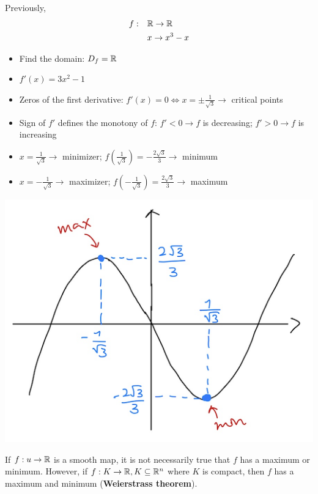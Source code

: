 Previously,
\begin{equation*}
    \begin{split}
        f: & \quad\mathbb{R}\to\mathbb{R}\\
        & \quad x\to x^3-x
    \end{split}
\end{equation*}
\begin{itemize}
    \item Find the domain: $D_f = \mathbb{R}$
    \item $f'(x) = 3x^2-1$
    \item Zeros of the first derivative: $f'(x)=0\Leftrightarrow x=\pm\frac{1}{\sqrt{3}} \to$ critical points
    \item Sign of $f'$ defines the monotony of $f$: $f'<0\to f$ is decreasing; $f'>0\to f$ is increasing
    \item $x=\frac{1}{\sqrt{3}}\to$ minimizer; $f(\frac{1}{\sqrt{3}})=-\frac{2\sqrt{3}}{3}\to$ minimum
    \item $x=-\frac{1}{\sqrt{3}}\to$ maximizer; $f(-\frac{1}{\sqrt{3}})=\frac{2\sqrt{3}}{3}\to$ maximum
\end{itemize}
\begin{center}
    \includegraphics[scale=0.5]{Images/22.png}
\end{center}

If $f: u\to\mathbb{R}$ is a smooth map, it is not necessarily true that $f$ has a maximum or minimum.
However, if $f: K\to\mathbb{R}, K\subseteq\mathbb{R}^n$ where $K$ is compact, then $f$ has a maximum and minimum (\textbf{Weierstrass theorem}).

